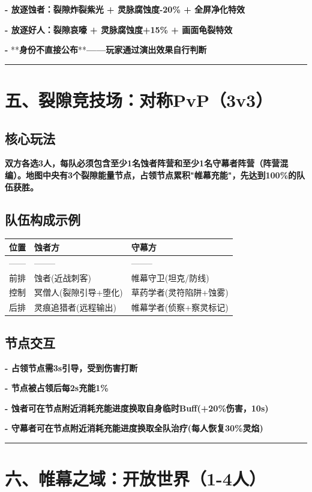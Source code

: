 \documentclass[12pt,a4paper,openany]{ctexbook}
\begin{document}
\textbf{- 放逐蚀者：裂隙炸裂紫光 + 灵脉腐蚀度-20\% + 全屏净化特效}

\textbf{- 放逐好人：裂隙哀嚎 + 灵脉腐蚀度+15\% + 画面龟裂特效}

\textbf{- }**\textbf{身份不直接公布}**\textbf{——玩家通过演出效果自行判断}


\bigskip\hrule\bigskip


\chapter{五、裂隙竞技场：对称PvP（3v3）}


\section*{核心玩法}


\textbf{双方各选3人，每队必须包含至少1名蚀者阵营和至少1名守幕者阵营（阵营混编）。地图中央有3个裂隙能量节点，占领节点累积"帷幕充能"，先达到100\%的队伍获胜。}


\section*{队伍构成示例}


\begin{tabular}{|l|l|l|}
\hline
位置 & 蚀者方 & 守幕方 \\
\hline
------ & -------- & -------- \\
前排 & 蚀者(近战刺客) & 帷幕守卫(坦克/防线) \\
控制 & 冥僧人(裂隙引导+堕化) & 草药学者(灵符陷阱+蚀雾) \\
后排 & 灵痕追猎者(远程输出) & 帷幕学者(侦察+察灵标记) \\
\hline
\end{tabular}


\section*{节点交互}


\textbf{- 占领节点需3s引导，受到伤害打断}

\textbf{- 节点被占领后每2s充能1\%}

\textbf{- 蚀者可在节点附近消耗充能进度换取自身临时Buff(+20\%伤害，10s)}

\textbf{- 守幕者可在节点附近消耗充能进度换取全队治疗(每人恢复30\%灵焰)}


\bigskip\hrule\bigskip


\chapter{六、帷幕之域：开放世界（1-4人）}
\end{document}
